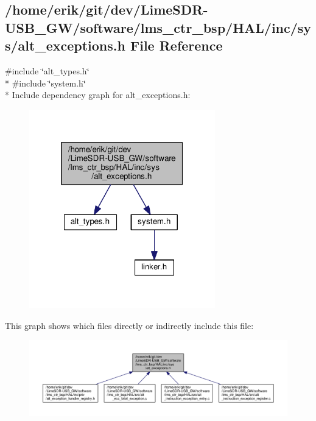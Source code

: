 \subsection{/home/erik/git/dev/\+Lime\+S\+D\+R-\/\+U\+S\+B\+\_\+\+G\+W/software/lms\+\_\+ctr\+\_\+bsp/\+H\+A\+L/inc/sys/alt\+\_\+exceptions.h File Reference}
\label{alt__exceptions_8h}
{\ttfamily \#include \char`\"{}alt\+\_\+types.\+h\char`\"{}}\\*
{\ttfamily \#include \char`\"{}system.\+h\char`\"{}}\\*
Include dependency graph for alt\+\_\+exceptions.\+h\+:
\nopagebreak
\begin{figure}[H]
\begin{center}
\leavevmode
\includegraphics[width=229pt]{d3/d70/alt__exceptions_8h__incl}
\end{center}
\end{figure}
This graph shows which files directly or indirectly include this file\+:
\nopagebreak
\begin{figure}[H]
\begin{center}
\leavevmode
\includegraphics[width=350pt]{dd/d4e/alt__exceptions_8h__dep__incl}
\end{center}
\end{figure}
